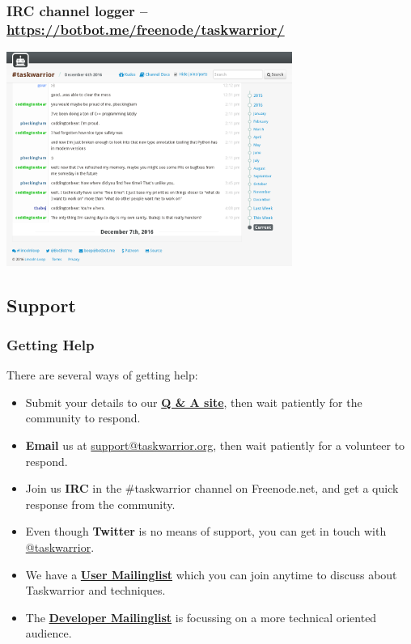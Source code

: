 \documentclass[t,handout,aspectratio=169]{beamer}
\begin{document}
\begin{frame}[fragile]\frametitle{IRC channel logger -- \url{https://botbot.me/freenode/taskwarrior/}}
    \begin{center}
        \href{https://botbot.me/freenode/taskwarrior/}{\includegraphics[height=7cm]{botbot-me-taskwarrior.png}}
    \end{center}
\end{frame}

\subsection{Support}

\begin{frame}[fragile]\frametitle{Getting Help}
    \vfill
    There are several ways of getting help:

    \begin{itemize}
        \item Submit your details to our \href{https://answers.tasktools.org}{\textbf{Q \& A site}}, then wait patiently for the community to respond.
        \item \textbf{Email} us at \href{mailto:support@taskwarrior.org}{support@taskwarrior.org}, then wait patiently for a volunteer to respond.
        \item Join us \textbf{IRC} in the \#taskwarrior channel on Freenode.net, and get a quick response from the community.
        \item Even though \textbf{Twitter} is no means of support, you can get in touch with \href{https://twitter.com/taskwarrior}{@taskwarrior}.
        \item We have a \href{https://groups.google.com/forum/\#!forum/taskwarrior-user}{\textbf{User Mailinglist}} which you can join anytime to discuss about Taskwarrior and techniques.
        \item The \href{https://groups.google.com/forum/\#!forum/taskwarrior-dev}{\textbf{Developer Mailinglist}} is focussing on a more technical oriented audience.
    \end{itemize}
\end{frame}
\end{document}
